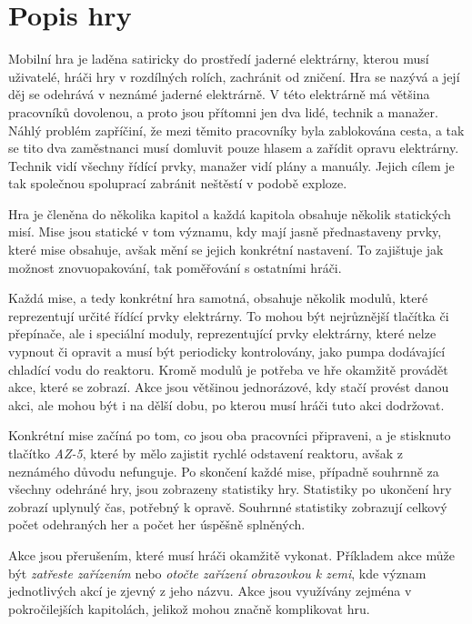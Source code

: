 \section{Popis hry}

Mobilní hra je laděna satiricky do prostředí jaderné elektrárny,
kterou musí uživatelé,
hráči hry v rozdílných rolích,
zachránit od zničení.
Hra se nazývá \emph{\myAppName}
a její děj se odehrává v neznámé jaderné elektrárně.
V této elektrárně má většina pracovníků dovolenou,
a proto jsou přítomni jen dva lidé,
technik a manažer.
Náhlý problém zapříčiní,
že mezi těmito pracovníky byla zablokována cesta,
a tak se tito dva zaměstnanci musí domluvit pouze hlasem
a zařídit opravu elektrárny.
Technik vidí všechny řídící prvky,
manažer vidí plány a manuály.
Jejich cílem je tak společnou spoluprací zabránit neštěstí v podobě exploze. 

Hra je členěna do několika kapitol
a každá kapitola obsahuje několik statických misí.
Mise jsou statické v tom významu,
kdy mají jasně přednastaveny prvky,
které mise obsahuje,
avšak mění se jejich konkrétní nastavení.
To zajištuje jak možnost znovuopakování,
tak poměřování s ostatními hráči.

Každá mise,
a tedy konkrétní hra samotná,
obsahuje několik modulů,
které reprezentují určité řídící prvky elektrárny.
To mohou být nejrůznější tlačítka či přepínače,
ale i speciální moduly,
reprezentující prvky elektrárny,
které nelze vypnout či opravit a musí být periodicky kontrolovány,
jako pumpa dodávající chladící vodu do reaktoru.
Kromě modulů je potřeba ve hře okamžitě provádět akce,
které se zobrazí.
Akce jsou většinou jednorázové,
kdy stačí provést danou akci,
ale mohou být i na dělší dobu,
po kterou musí hráči tuto akci dodržovat.

Konkrétní mise začíná po tom,
co jsou oba pracovníci připraveni,
a je stisknuto tlačítko \emph{AZ-5},
které by mělo zajistit rychlé odstavení reaktoru,
avšak z neznámého důvodu nefunguje.
Po skončení každé mise,
případně souhrnně za všechny odehráné hry,
jsou zobrazeny statistiky hry.
Statistiky po ukončení hry zobrazí uplynulý čas,
potřebný k opravě.
Souhrnné statistiky zobrazují 
celkový počet odehraných her a počet her úspěšně splněných.

Akce jsou přerušením,
které musí hráči okamžitě vykonat.
Příkladem akce může být \emph{zatřeste zařízením} nebo
\emph{otočte zařízení obrazovkou k zemi},
kde význam jednotlivých akcí je zjevný z jeho názvu.
Akce jsou využívány zejména v pokročilejších kapitolách,
jelikož mohou značně komplikovat hru.

